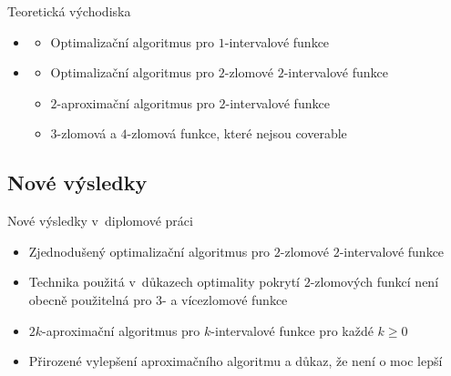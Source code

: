 \documentclass{beamer}
\theoremstyle{remark}
\begin{document}
\begin{frame}{Teoretická východiska}


\begin{itemize}
\item \citet{Schieber2005154}
\begin{itemize}
\item
Optimalizační algoritmus pro $1$-intervalové funkce
\end{itemize}

\item \citet{Dubovsky2012}
\begin{itemize}
\item
Optimalizační algoritmus pro $2$-zlomové $2$-intervalové funkce

\item
$2$-aproximační algoritmus pro $2$-intervalové funkce

\item $3$-zlomová a $4$-zlomová funkce,
které nejsou coverable
\end{itemize}
\end{itemize}

\end{frame}

\subsection{Nové výsledky}

\begin{frame}{Nové výsledky v~diplomové práci}
\begin{itemize}
\item Zjednodušený optimalizační algoritmus pro $2$-zlomové $2$-intervalové funkce
\item Technika použitá v~důkazech optimality pokrytí $2$-zlomových funkcí není obecně použitelná pro $3$- a vícezlomové funkce
\item $2k$-aproximační algoritmus pro $k$-intervalové funkce pro každé $k \geq 0$
\item Přirozené vylepšení aproximačního algoritmu a důkaz, že není o moc lepší
\end{itemize}
\end{frame}
\end{document}
